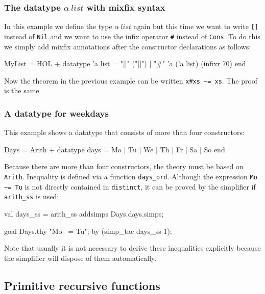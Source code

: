 \subsubsection{The datatype $\alpha~list$ with mixfix syntax}

In this example we define the type $\alpha~list$ again but this time we want
to write {\tt []} instead of {\tt Nil} and we want to use the infix operator
\verb|#| instead of {\tt Cons}. To do this we simply add mixfix annotations
after the constructor declarations as follows:
\begin{ttbox}
MyList = HOL +
  datatype 'a list = "[]" ("[]") 
                   | "#" 'a ('a list) (infixr 70)
end
\end{ttbox}
Now the theorem in the previous example can be written \verb|x#xs ~= xs|. The
proof is the same.


\subsubsection{A datatype for weekdays}

This example shows a datatype that consists of more than four constructors:
\begin{ttbox}
Days = Arith +
  datatype days = Mo | Tu | We | Th | Fr | Sa | So
end
\end{ttbox}
Because there are more than four constructors, the theory must be based on
{\tt Arith}. Inequality is defined via a function \verb|days_ord|. Although
the expression \verb|Mo ~= Tu| is not directly contained in {\tt distinct},
it can be proved by the simplifier if \verb$arith_ss$ is used:
\begin{ttbox}
val days_ss = arith_ss addsimps Days.days.simps;

goal Days.thy "Mo ~= Tu";
by (simp_tac days_ss 1);
\end{ttbox}
Note that usually it is not necessary to derive these inequalities explicitly
because the simplifier will dispose of them automatically.

\subsection{Primitive recursive functions}

